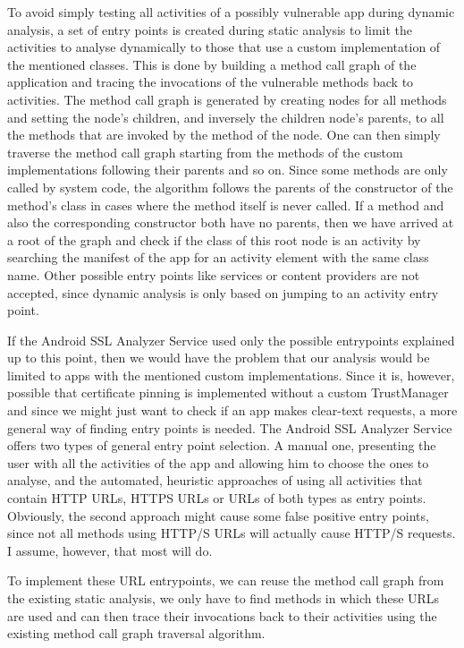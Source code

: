 \documentclass[draft,final]{vutinfth} %
\begin{document}
To avoid simply testing all activities of a possibly vulnerable app during dynamic analysis, a set of entry points is created during static analysis to limit the activities to analyse dynamically to those that use a custom implementation of the mentioned classes. This is done by building a method call graph of the application and tracing the invocations of the vulnerable methods back to activities. The method call graph is generated by creating nodes for all methods and setting the node's children, and inversely the children node's parents, to all the methods that are invoked by the method of the node. One can then simply traverse the method call graph starting from the methods of the custom implementations following their parents and so on. Since some methods are only called by system code, the algorithm follows the parents of the constructor of the method's class in cases where the method itself is never called. If a method and also the corresponding constructor both have no parents, then we have arrived at a root of the graph and check if the class of this root node is an activity by searching the manifest of the app for an activity element with the same class name. Other possible entry points like services or content providers are not accepted, since dynamic analysis is only based on jumping to an activity entry point. 

If the Android SSL Analyzer Service used only the possible entrypoints explained up to this point,  then we would have the problem that our analysis would be limited to apps with the mentioned custom implementations. Since it is, however, possible that certificate pinning is implemented without a custom TrustManager and since we might just want to check if an app makes clear-text requests, a more general way of finding entry points is needed. The Android SSL Analyzer Service offers two types of general entry point selection. A manual one, presenting the user with all the activities of the app and allowing him to choose the ones to analyse, and the automated, heuristic approaches of using all activities that contain HTTP URLs, HTTPS URLs or URLs of both types as entry points. Obviously, the second approach might cause some false positive entry points, since not all methods using HTTP/S URLs will actually cause HTTP/S requests. I assume, however, that most will do.

To implement these URL entrypoints, we can reuse the method call graph from the existing static analysis, we only have to find methods in which these URLs are used and can then trace their invocations back to their activities using the existing method call graph traversal algorithm. 
\end{document}
